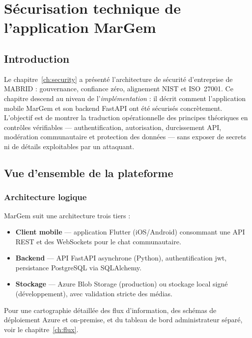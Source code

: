 \chapter{Sécurisation technique de l'application MarGem}
\label{ch:app-security}

\section{Introduction}

Le chapitre~\ref{ch:security} a présenté l'architecture de sécurité d'entreprise de MABRID : gouvernance, confiance zéro, alignement NIST et ISO~27001. Ce chapitre descend au niveau de l'\emph{implémentation} : il décrit comment l'application mobile MarGem et son backend FastAPI ont été sécurisés concrètement. L'objectif est de montrer la traduction opérationnelle des principes théoriques en contrôles vérifiables --- authentification, autorisation, durcissement API, modération communautaire et protection des données --- sans exposer de secrets ni de détails exploitables par un attaquant.

\section{Vue d'ensemble de la plateforme}

\subsection{Architecture logique}

MarGem suit une architecture trois tiers :
\begin{itemize}
  \item \textbf{Client mobile} --- application Flutter (iOS/Android) consommant une API REST et des WebSockets pour le chat communautaire.
  \item \textbf{Backend} --- API FastAPI asynchrone (Python), authentification \gls{jwt}, persistance PostgreSQL via SQLAlchemy.
  \item \textbf{Stockage} --- Azure Blob Storage (production) ou stockage local signé (développement), avec validation stricte des médias.
\end{itemize}


Pour une cartographie détaillée des flux d'information, des schémas de déploiement Azure et on-premise, et du tableau de bord administrateur séparé, voir le chapitre~\ref{ch:flux}.

